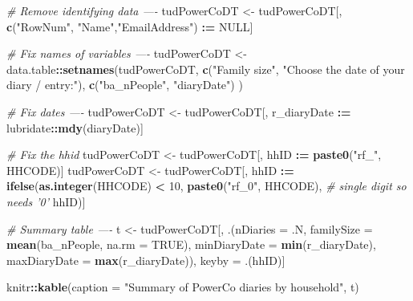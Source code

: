 \documentclass[]{article}
\newenvironment{Shaded}{\begin{snugshade}}{\end{snugshade}}
\newcommand{\KeywordTok}[1]{\textcolor[rgb]{0.13,0.29,0.53}{\textbf{#1}}}
\newcommand{\DataTypeTok}[1]{\textcolor[rgb]{0.13,0.29,0.53}{#1}}
\newcommand{\DecValTok}[1]{\textcolor[rgb]{0.00,0.00,0.81}{#1}}
\newcommand{\StringTok}[1]{\textcolor[rgb]{0.31,0.60,0.02}{#1}}
\newcommand{\CommentTok}[1]{\textcolor[rgb]{0.56,0.35,0.01}{\textit{#1}}}
\newcommand{\OtherTok}[1]{\textcolor[rgb]{0.56,0.35,0.01}{#1}}
\newcommand{\OperatorTok}[1]{\textcolor[rgb]{0.81,0.36,0.00}{\textbf{#1}}}
\newcommand{\ErrorTok}[1]{\textcolor[rgb]{0.64,0.00,0.00}{\textbf{#1}}}
\newcommand{\NormalTok}[1]{#1}
\begin{document}
\begin{Shaded}
\begin{Highlighting}[]
\CommentTok{# Remove identifying data ----}
\NormalTok{tudPowerCoDT <-}\StringTok{ }\NormalTok{tudPowerCoDT[, }\KeywordTok{c}\NormalTok{(}\StringTok{"RowNum"}\NormalTok{, }\StringTok{"Name"}\NormalTok{,}\StringTok{"EmailAddress"}\NormalTok{) }\OperatorTok{:}\ErrorTok{=}\StringTok{ }\OtherTok{NULL}\NormalTok{]}

\CommentTok{# Fix names of variables ----}
\NormalTok{tudPowerCoDT <-}\StringTok{ }\NormalTok{data.table}\OperatorTok{::}\KeywordTok{setnames}\NormalTok{(tudPowerCoDT, }
                                    \KeywordTok{c}\NormalTok{(}\StringTok{"Family size"}\NormalTok{, }\StringTok{"Choose the date of your diary / entry:"}\NormalTok{), }
                                    \KeywordTok{c}\NormalTok{(}\StringTok{"ba_nPeople"}\NormalTok{, }\StringTok{"diaryDate"}\NormalTok{)}
\NormalTok{)}

\CommentTok{# Fix dates ----}
\NormalTok{tudPowerCoDT <-}\StringTok{ }\NormalTok{tudPowerCoDT[, r_diaryDate }\OperatorTok{:}\ErrorTok{=}\StringTok{ }\NormalTok{lubridate}\OperatorTok{::}\KeywordTok{mdy}\NormalTok{(diaryDate)]}

\CommentTok{# Fix the hhid}
\NormalTok{tudPowerCoDT <-}\StringTok{ }\NormalTok{tudPowerCoDT[, hhID }\OperatorTok{:}\ErrorTok{=}\StringTok{ }\KeywordTok{paste0}\NormalTok{(}\StringTok{"rf_"}\NormalTok{, HHCODE)]}
\NormalTok{tudPowerCoDT <-}\StringTok{ }\NormalTok{tudPowerCoDT[, hhID }\OperatorTok{:}\ErrorTok{=}\StringTok{ }\KeywordTok{ifelse}\NormalTok{(}\KeywordTok{as.integer}\NormalTok{(HHCODE) }\OperatorTok{<}\StringTok{ }\DecValTok{10}\NormalTok{, }
                                              \KeywordTok{paste0}\NormalTok{(}\StringTok{"rf_0"}\NormalTok{, HHCODE), }\CommentTok{# single digit so needs '0'}
\NormalTok{                                                     hhID)]}

\CommentTok{# Summary table ----}
\NormalTok{t <-}\StringTok{ }\NormalTok{tudPowerCoDT[, .(}\DataTypeTok{nDiaries =}\NormalTok{ .N,}
                      \DataTypeTok{familySize =} \KeywordTok{mean}\NormalTok{(ba_nPeople, }\DataTypeTok{na.rm =} \OtherTok{TRUE}\NormalTok{),}
                      \DataTypeTok{minDiaryDate =} \KeywordTok{min}\NormalTok{(r_diaryDate),}
                      \DataTypeTok{maxDiaryDate =} \KeywordTok{max}\NormalTok{(r_diaryDate)), keyby =}\StringTok{ }\NormalTok{.(hhID)]}

\NormalTok{knitr}\OperatorTok{::}\KeywordTok{kable}\NormalTok{(}\DataTypeTok{caption =} \StringTok{"Summary of PowerCo diaries by household"}\NormalTok{, t)}
\end{Highlighting}
\end{Shaded}
\end{document}

